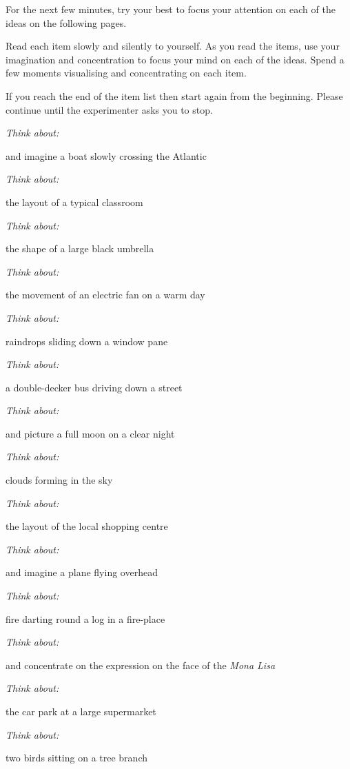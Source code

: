 For the next few minutes, try your best to focus your attention on each
of the ideas on the following pages.

Read each item slowly and silently to yourself. As you read the items,
use your imagination and concentration to focus
your mind on each of the ideas. Spend a few moments visualising and concentrating on each item.

If you reach the end of the item list then start again from the
beginning. Please continue until the experimenter asks
you to stop.

\textit{Think about:}

and imagine a boat slowly crossing the Atlantic

\textit{Think about:}

the layout of a typical classroom

\textit{Think about:}

the shape of a large black umbrella

\textit{Think about:}

the movement of an electric fan on a warm day 

\textit{Think about:}

raindrops sliding down a window pane

\textit{Think about:}

a double-decker bus driving down a street

\textit{Think about:}

and picture a full moon on a clear night

\textit{Think about:}

clouds forming in the sky

\textit{Think about:}

the layout of the local shopping centre

\textit{Think about:}

and imagine a plane flying overhead

\textit{Think about:}

fire darting round a log in a fire-place

\textit{Think about:}

and concentrate on the expression on the face of the \textit{Mona Lisa}

\textit{Think about:}

the car park at a large supermarket

\textit{Think about:}

two birds sitting on a tree branch

